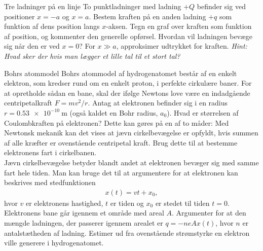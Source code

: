 \begin{opgave}{Tre ladninger på en linje}
    To punktladninger med ladning $+Q$ befinder sig ved positioner $x=-a$ og $x=a$.
    \opg Bestem kraften på en anden ladning $+q$ som funktion af dens position langs $x$-aksen.
    \opg Tegn en graf over kraften som funktion af position, og kommenter den generelle opførsel.
    \opg Hvordan vil ladningen bevæge sig når den er ved $x=0$?
    \opg For $x\gg a$, approksimer udtrykket for kraften. \textit{Hint: Hvad sker der hvis man lægger et lille tal til et stort tal?}
\end{opgave}

\begin{opgave}{Bohrs atommodel}
    Bohrs atommodel af hydrogenatomet består af en enkelt elektron, som kredser rund om en enkelt proton, i perfekte cirkulære baner. For at opretholde sådan en bane, skal der ifølge Newtons love være en indadgående centripetalkraft $F=mv^2/r$. Antag at elektronen befinder sig i en radius $r=\SI{0.53e-10}{\meter}$ (også kaldet en Bohr radius, $a_0$).
    \opg Hvad er størrelsen af Coulombkraften på elektronen? Dette kan gøres på en af to måder:
    \opg Med Newtonsk mekanik kan det vises at jævn cirkelbevægelse er opfyldt, hvis summen af alle kræfter er ovenstående centripetal kraft. Brug dette til at bestemme elektronens fart i cirkelbanen. \\[4mm]
    Jævn cirkelbevægelse betyder blandt andet at elektronen bevæger sig med samme fart hele tiden. Man kan bruge det til at argumentere for at elektronen kan beskrives med stedfunktionen
    \begin{align*}
        x(t) = vt + x_0,
    \end{align*}
    hvor $v$ er elektronens hastighed, $t$ er tiden og $x_0$ er stedet til tiden $t=0$. \\[4mm]
    Elektronens bane går igennem et område med areal $A$. Argumenter for at den mængde ladningen, der passerer igennem arealet er $q = -neAx(t)$, hvor $n$ er antalstætheden af ladning.
    \opg Estimer ud fra ovenstående strømstyrke en elektron ville generere i hydrogenatomet.
\end{opgave}

